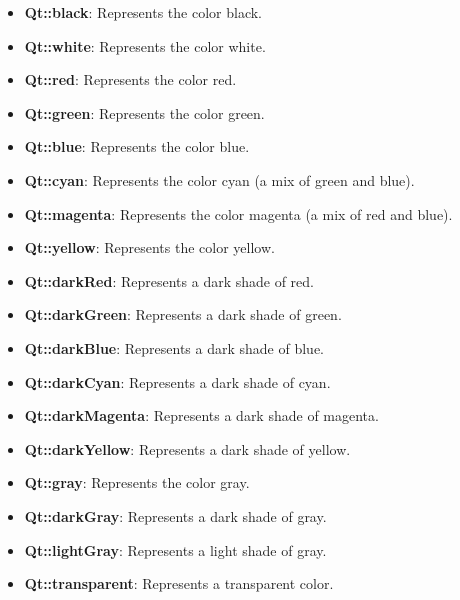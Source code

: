 \documentclass{report}
\begin{document}
    \pagebreak 
    \begin{itemize}
        \item \textbf{Qt::black}: Represents the color black.
        \item \textbf{Qt::white}: Represents the color white.
        \item \textbf{Qt::red}: Represents the color red.
        \item \textbf{Qt::green}: Represents the color green.
        \item \textbf{Qt::blue}: Represents the color blue.
        \item \textbf{Qt::cyan}: Represents the color cyan (a mix of green and blue).
        \item \textbf{Qt::magenta}: Represents the color magenta (a mix of red and blue).
        \item \textbf{Qt::yellow}: Represents the color yellow.
        \item \textbf{Qt::darkRed}: Represents a dark shade of red.
        \item \textbf{Qt::darkGreen}: Represents a dark shade of green.
        \item \textbf{Qt::darkBlue}: Represents a dark shade of blue.
        \item \textbf{Qt::darkCyan}: Represents a dark shade of cyan.
        \item \textbf{Qt::darkMagenta}: Represents a dark shade of magenta.
        \item \textbf{Qt::darkYellow}: Represents a dark shade of yellow.
        \item \textbf{Qt::gray}: Represents the color gray.
        \item \textbf{Qt::darkGray}: Represents a dark shade of gray.
        \item \textbf{Qt::lightGray}: Represents a light shade of gray.
        \item \textbf{Qt::transparent}: Represents a transparent color.
    \end{itemize}
\end{document}
